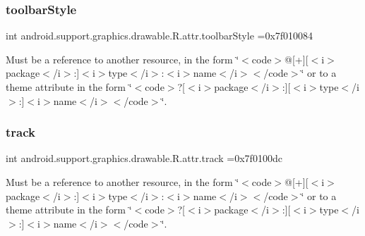 \subsubsection{\texorpdfstring{toolbar\+Style}{toolbarStyle}}
{\footnotesize\ttfamily int android.\+support.\+graphics.\+drawable.\+R.\+attr.\+toolbar\+Style =0x7f010084\hspace{0.3cm}{\ttfamily [static]}}

Must be a reference to another resource, in the form \char`\"{}$<$code$>$@\mbox{[}+\mbox{]}\mbox{[}$<$i$>$package$<$/i$>$\+:\mbox{]}$<$i$>$type$<$/i$>$\+:$<$i$>$name$<$/i$>$$<$/code$>$\char`\"{} or to a theme attribute in the form \char`\"{}$<$code$>$?\mbox{[}$<$i$>$package$<$/i$>$\+:\mbox{]}\mbox{[}$<$i$>$type$<$/i$>$\+:\mbox{]}$<$i$>$name$<$/i$>$$<$/code$>$\char`\"{}. \mbox{\label{classandroid_1_1support_1_1graphics_1_1drawable_1_1R_1_1attr_adc6ed90f8e501354319cd5f177d44d2c}} 
\subsubsection{\texorpdfstring{track}{track}}
{\footnotesize\ttfamily int android.\+support.\+graphics.\+drawable.\+R.\+attr.\+track =0x7f0100dc\hspace{0.3cm}{\ttfamily [static]}}

Must be a reference to another resource, in the form \char`\"{}$<$code$>$@\mbox{[}+\mbox{]}\mbox{[}$<$i$>$package$<$/i$>$\+:\mbox{]}$<$i$>$type$<$/i$>$\+:$<$i$>$name$<$/i$>$$<$/code$>$\char`\"{} or to a theme attribute in the form \char`\"{}$<$code$>$?\mbox{[}$<$i$>$package$<$/i$>$\+:\mbox{]}\mbox{[}$<$i$>$type$<$/i$>$\+:\mbox{]}$<$i$>$name$<$/i$>$$<$/code$>$\char`\"{}. \mbox{\label{classandroid_1_1support_1_1graphics_1_1drawable_1_1R_1_1attr_a3d87ec7f20ae1747ecf8e78e1806273a}} 
